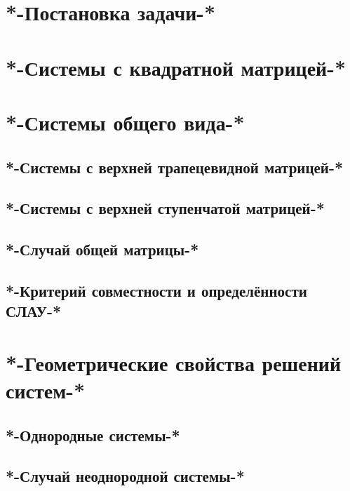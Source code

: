 \chapter{*-Постановка задачи-*}
\chapter{*-Системы с квадратной матрицей-*}
\chapter{*-Системы общего вида-*}
\section{*-Системы с верхней трапецевидной матрицей-*}
\section{*-Системы с верхней ступенчатой матрицей-*}
\section{*-Случай общей матрицы-*}
\section{*-Критерий совместности и определённости СЛАУ-*}
\chapter{*-Геометрические свойства решений систем-*}
\section{*-Однородные системы-*}
\section{*-Случай неоднородной системы-*}
